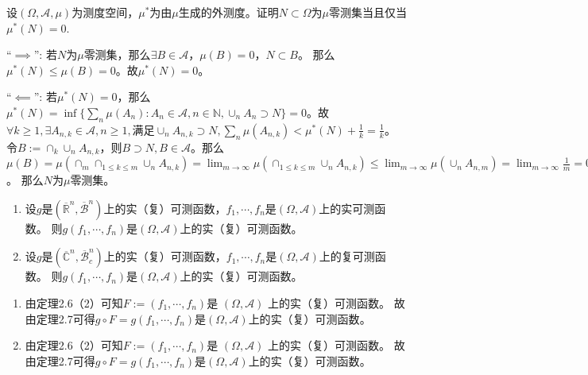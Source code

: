 \documentclass{ctexart}
\begin{document}
\begin{problem}\label{pro:23}
 设\((\Omega,\mathcal{A},\mu) \)为测度空间，\(\mu^* \)为由\(\mu \)生成的外测度。证明\(N \subset \Omega \)为\(\mu  \)零测集当且仅当\(\mu^*(N)=0 \). 
\end{problem}
\begin{solution}
``\(\implies\)'': 若\(N \)为\(\mu \)零测集，那么\(\exists B \in \mathcal{A} \)，\(\mu(B)=0 \)，\(N \subset B \)。
那么\(\mu^*(N) \leq \mu(B)=0 \)。故\(\mu^*(N)=0 \)。 

``\(\impliedby\)'': 若\(\mu^*(N)=0 \)，那么\(\mu^*(N)=\inf\{\sum_{n}\mu(A_n):A_n \in \mathcal{A}, n \in \mathbb{N}, \cup_n A_n \supset N\}=0\)。故\(\forall k  \geq 1, \exists A_{n,k} \in \mathcal{A}, n  \geq 1, \)满足\(\cup_n A_{n,k} \supset N, \sum_{n}\mu(A_{n,k}) < \mu^*(N) + \frac{1}{k}=\frac{1}{k} \)。
令\(B := \cap_k \cup_n A_{n,k} \)，则\(B \supset N, B \in \mathcal{A} \)。那么\(\mu(B)=\mu(\cap_{m} \cap_{ 1 \leq k \leq m} \cup_{n}A_{n,k})=\lim_{m \to \infty}\mu(\cap_{1 \leq k \leq m} \cup_n A_{n,k}) \leq \lim_{m \to \infty} \mu(\cup_n A_{n,m}) = \lim_{m \to \infty} \frac{1}{m} =0  \)。
那么\(N \)为\(\mu \)零测集。
\end{solution}
\begin{problem}\label{pro:2.5.2}
  \begin{enumerate}
    \item   设\(g \)是\((\overline{\mathbb{R}}^n,\overline{\mathcal{B}}^n) \)上的实（复）可测函数，\(f_1,\cdots,f_n \)是\((\Omega,\mathcal{A}) \)上的实可测函数。
      则\(g(f_1,\cdots,f_n) \)是\((\Omega,\mathcal{A}) \)上的实（复）可测函数。
    \item   设\(g \)是\((\overline{\mathbb{C}}^n,\overline{\mathcal{B}}^n_c) \)上的实（复）可测函数，\(f_1,\cdots,f_n \)是\((\Omega,\mathcal{A}) \)上的复可测函数。
      则\(g(f_1,\cdots,f_n) \)是\((\Omega,\mathcal{A}) \)上的实（复）可测函数。
  \end{enumerate}
\end{problem}
\begin{solution}
  \begin{enumerate}
    \item 由定理2.6（2）可知\(F:=(f_1,\cdots,f_n) \)是{ \((\Omega,\mathcal{A}) \) }上的{实（复）可测函数}。
      故由定理2.7可得\(g \circ F=g(f_1,\cdots,f_n) \)是\((\Omega,\mathcal{A}) \)上的{实（复）可测函数}。
    \item 由定理2.6（2）可知\(F:=(f_1,\cdots,f_n) \)是{ \((\Omega,\mathcal{A}) \) }上的{实（复）可测函数}。
      故由定理2.7可得\(g \circ F=g(f_1,\cdots,f_n) \)是\((\Omega,\mathcal{A}) \)上的{实（复）可测函数}。
  \end{enumerate}
\end{solution}
\end{document}
